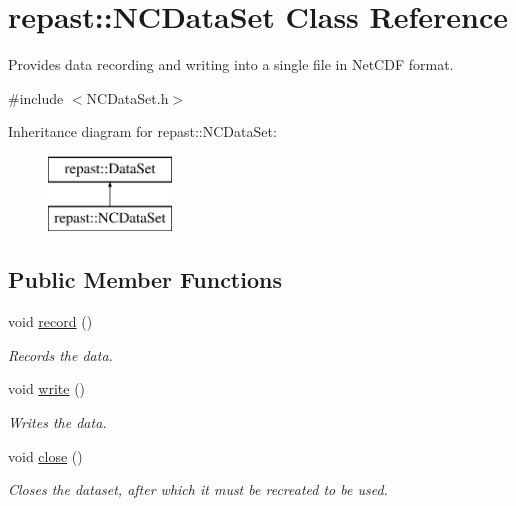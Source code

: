 \hypertarget{classrepast_1_1_n_c_data_set}{\section{repast\-:\-:N\-C\-Data\-Set Class Reference}
\label{classrepast_1_1_n_c_data_set}
}


Provides data recording and writing into a single file in Net\-C\-D\-F format.  




{\ttfamily \#include $<$N\-C\-Data\-Set.\-h$>$}

Inheritance diagram for repast\-:\-:N\-C\-Data\-Set\-:\begin{figure}[H]
\begin{center}
\leavevmode
\includegraphics[height=2.000000cm]{classrepast_1_1_n_c_data_set}
\end{center}
\end{figure}
\subsection*{Public Member Functions}
\begin{DoxyCompactItemize}
\item 
\hypertarget{classrepast_1_1_n_c_data_set_a1f4023890763fbfc4323df54d5d90f9e}{void \hyperlink{classrepast_1_1_n_c_data_set_a1f4023890763fbfc4323df54d5d90f9e}{record} ()}\label{classrepast_1_1_n_c_data_set_a1f4023890763fbfc4323df54d5d90f9e}

\begin{DoxyCompactList}\small\item\em Records the data. \end{DoxyCompactList}\item 
\hypertarget{classrepast_1_1_n_c_data_set_a715c1d9a179a2586c42d3b483fa52826}{void \hyperlink{classrepast_1_1_n_c_data_set_a715c1d9a179a2586c42d3b483fa52826}{write} ()}\label{classrepast_1_1_n_c_data_set_a715c1d9a179a2586c42d3b483fa52826}

\begin{DoxyCompactList}\small\item\em Writes the data. \end{DoxyCompactList}\item 
\hypertarget{classrepast_1_1_n_c_data_set_a40f1359629cc1ae4aa974eb52ff8a690}{void \hyperlink{classrepast_1_1_n_c_data_set_a40f1359629cc1ae4aa974eb52ff8a690}{close} ()}\label{classrepast_1_1_n_c_data_set_a40f1359629cc1ae4aa974eb52ff8a690}

\begin{DoxyCompactList}\small\item\em Closes the dataset, after which it must be recreated to be used. \end{DoxyCompactList}\end{DoxyCompactItemize}
